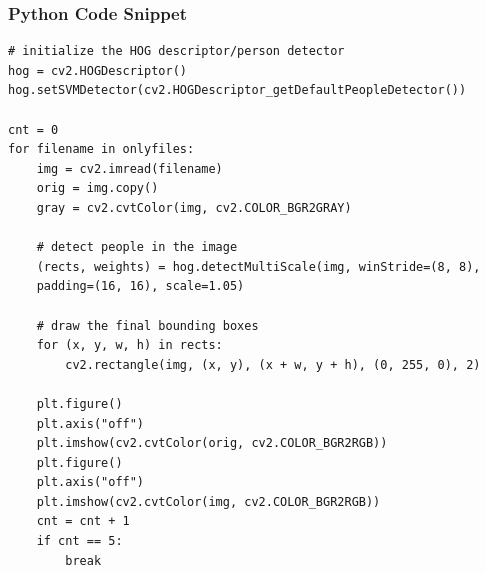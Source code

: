 \subsubsection{Python Code Snippet}

\begin{lstlisting}
# initialize the HOG descriptor/person detector
hog = cv2.HOGDescriptor()
hog.setSVMDetector(cv2.HOGDescriptor_getDefaultPeopleDetector())

cnt = 0
for filename in onlyfiles:
    img = cv2.imread(filename)
    orig = img.copy()
    gray = cv2.cvtColor(img, cv2.COLOR_BGR2GRAY)

    # detect people in the image
    (rects, weights) = hog.detectMultiScale(img, winStride=(8, 8),
    padding=(16, 16), scale=1.05)

    # draw the final bounding boxes
    for (x, y, w, h) in rects:
        cv2.rectangle(img, (x, y), (x + w, y + h), (0, 255, 0), 2)

    plt.figure()
    plt.axis("off")
    plt.imshow(cv2.cvtColor(orig, cv2.COLOR_BGR2RGB))
    plt.figure()
    plt.axis("off")
    plt.imshow(cv2.cvtColor(img, cv2.COLOR_BGR2RGB))
    cnt = cnt + 1
    if cnt == 5:
        break
\end{lstlisting}

